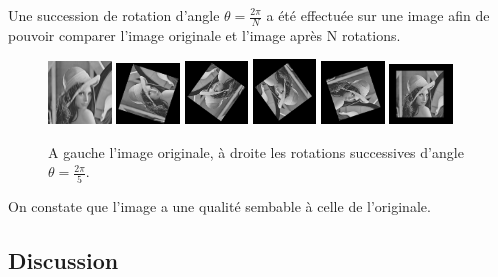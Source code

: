 Une succession de rotation d'angle $\theta = \frac{2\pi}{N}$ a été effectuée sur une image afin de pouvoir comparer l'image originale et l'image après N rotations. 

\begin{figure}[h]
	\includegraphics[width=0.15\textwidth]{lena.png}
	\includegraphics[width=0.15\textwidth]{rotation_2pi_1.png}
	\includegraphics[width=0.15\textwidth]{rotation_2pi_2.png}
	\includegraphics[width=0.15\textwidth]{rotation_2pi_3.png}
	\includegraphics[width=0.15\textwidth]{rotation_2pi_4.png}
	\includegraphics[width=0.15\textwidth]{rotation_2pi_5.png}
  \caption{A gauche l'image originale, à droite les rotations successives d'angle $\theta = \frac{2\pi}{5}$.}
\end{figure}

On constate que l'image a une qualité sembable à celle de l'originale. 

\subsection{Discussion}

